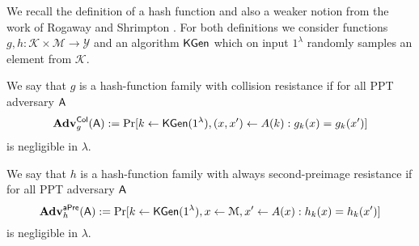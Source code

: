 
We recall the definition of a hash function and also a weaker notion from the work of Rogaway and Shrimpton \cite{FSE:RogShr04}. For both definitions we consider functions $g,h:\mathcal{K}\times\mathcal{M}\to\mathcal{Y}$ and an algorithm $\mathsf{KGen}$ which on input $1^\lambda$ randomly samples an element from $\mathcal{K}$.

\begin{definition}\label{def:hash1}
 We say that $g$ is a hash-function family with collision resistance if for all PPT adversary $\mathsf{A}$
$$
\mathbf{Adv}_g^{\mathsf{Col}}(\mathsf{A}) := \Pr[k\gets\mathsf{KGen}(1^\lambda), (x,x')\gets A(k):g_k(x)=g_k(x')]
$$ 
is negligible in $\lambda$.
\end{definition}

\begin{definition}\label{def:hash2}
 We say that $h$ is a hash-function family with always second-preimage resistance if for all PPT adversary $\mathsf{A}$
$$
\mathbf{Adv}_h^{\mathsf{aPre}}(\mathsf{A}) := \Pr[k\gets\mathsf{KGen}(1^\lambda), x\gets\mathcal{M}, x'\gets A(x):h_k(x)=h_k(x')]
$$ 
is negligible in $\lambda$.
\end{definition}